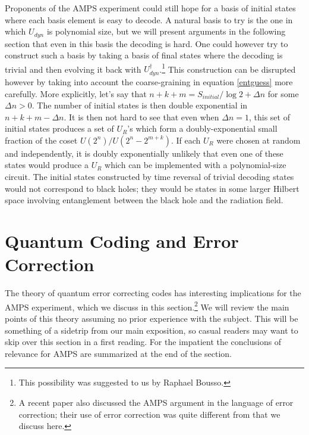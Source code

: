 \documentclass[12pt]{article}
\begin{document}
Proponents of the AMPS experiment could still hope for a basis of initial states where each basis element is easy to decode.  A natural basis to try is the one in which $U_{dyn}$ is polynomial size, but we will present arguments in the following section that even in this basis the decoding is hard.  One could however try to construct such a basis by taking a basis of final states where the decoding is trivial and then evolving it back with $U_{dyn}^\dagger$.\footnote{This possibility was suggested to us by Raphael Bousso.}  This construction can be disrupted however by taking into account the coarse-graining in equation \eqref{entguess} more carefully.  More explicitly, let's say that $n+k+m=S_{initial}/\log 2+\Delta n$ for some $\Delta n > 0$.  The number of initial states is then double exponential in $n+k+m-\Delta n$.  It is then not hard to see that even when $\Delta n=1$, this set of initial states produces a set of $U_R$'s which form a doubly-exponential small fraction of the coset $U(2^n)/U(2^n-2^{m+k})$.  If each $U_R$ were chosen at random and independently, it is doubly exponentially unlikely that even one of these states would produce a $U_R$ which can be implemented with a polynomial-size circuit.  The initial states constructed by time reversal of trivial decoding states would not correspond to black holes; they would be states in some larger Hilbert space involving entanglement between the black hole and the radiation field.  
  
\section{Quantum Coding and Error Correction}\label{decsect}
The theory of quantum error correcting codes has interesting implications for the AMPS experiment, which we discuss in this section.\footnote{A recent paper \cite{Verlinde:2012cy} also discussed the AMPS argument in the language of error correction; their use of error correction was quite different from that we discuss here.}  We will review the main points of this theory assuming no prior experience with the subject.  This will be something of a sidetrip from our main exposition, so casual readers may want to skip over this section in a first reading.  For the impatient the conclusions of relevance for AMPS are summarized at the end of the section.  
\end{document}
